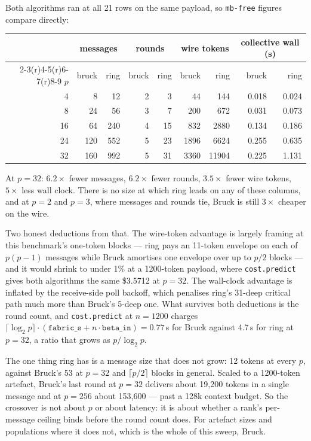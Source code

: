 \documentclass[11pt]{article}
\begin{document}
Both algorithms ran at all 21 rows on the same payload, so \texttt{mb-free} figures compare
directly:

\begin{center}\footnotesize
\begin{tabular}{@{}rrrrrrrrr@{}}
\toprule
  & \multicolumn{2}{c}{messages} & \multicolumn{2}{c}{rounds} & \multicolumn{2}{c}{wire tokens} & \multicolumn{2}{c}{collective wall (s)} \\
  \cmidrule(r){2-3}\cmidrule(r){4-5}\cmidrule(r){6-7}\cmidrule(r){8-9}
  $p$ & bruck & ring & bruck & ring & bruck & ring & bruck & ring \\
\midrule
  4  & 8   & 12  & 2 & 3  & 44   & 144   & 0.018 & 0.024 \\
  8  & 24  & 56  & 3 & 7  & 200  & 672   & 0.031 & 0.073 \\
  16 & 64  & 240 & 4 & 15 & 832  & 2880  & 0.134 & 0.186 \\
  24 & 120 & 552 & 5 & 23 & 1896 & 6624  & 0.255 & 0.635 \\
  32 & 160 & 992 & 5 & 31 & 3360 & 11904 & 0.225 & 1.131 \\
\bottomrule
\end{tabular}\normalsize
\end{center}

\noindent
At $p=32$: $6.2\times$ fewer messages, $6.2\times$ fewer rounds, $3.5\times$ fewer wire tokens,
$5\times$ less wall clock. There is no size at which ring leads on any of these columns, and at
$p=2$ and $p=3$, where messages and rounds tie, Bruck is still $3\times$ cheaper on the wire.

Two honest deductions from that. The wire-token advantage is largely framing at this benchmark's
one-token blocks --- ring pays an 11-token envelope on each of $p(p-1)$ messages while Bruck
amortises one envelope over up to $p/2$ blocks --- and it would shrink to under 1\% at a
1200-token payload, where \texttt{cost.predict} gives both algorithms the same \$3.5712 at
$p=32$. The wall-clock advantage is inflated by the receive-side poll backoff, which penalises
ring's 31-deep critical path much more than Bruck's 5-deep one. What survives both deductions is
the round count, and \texttt{cost.predict} at $n=1200$ charges $\lceil\log_2 p\rceil \cdot
(\texttt{fabric\_s} + n \cdot \texttt{beta\_in}) = 0.77$\,s for Bruck against 4.7\,s for ring at
$p=32$, a ratio that grows as $p/\log_2 p$.

The one thing ring has is a message size that does not grow: 12 tokens at every $p$, against
Bruck's 53 at $p=32$ and $\lceil p/2\rceil$ blocks in general. Scaled to a 1200-token artefact,
Bruck's last round at $p=32$ delivers about 19{,}200 tokens in a single message and at $p=256$
about 153{,}600 --- past a 128k context budget. So the crossover is not about $p$ or about
latency: it is about whether a rank's per-message ceiling binds before the round count does. For
artefact sizes and populations where it does not, which is the whole of this sweep, Bruck.
\end{document}
